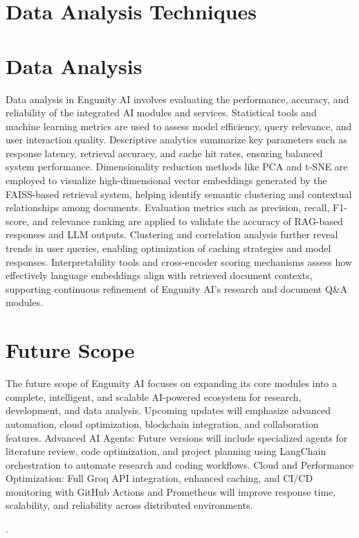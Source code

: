 \pagebreak

\section{Data Analysis Techniques}

\section{Data Analysis}

Data analysis in Engunity AI involves evaluating the performance, accuracy, and reliability of the integrated AI modules and services. Statistical tools and machine learning metrics are used to assess model efficiency, query relevance, and user interaction quality. Descriptive analytics summarize key parameters such as response latency, retrieval accuracy, and cache hit rates, ensuring balanced system performance.  
Dimensionality reduction methods like PCA and t-SNE are employed to visualize high-dimensional vector embeddings generated by the FAISS-based retrieval system, helping identify semantic clustering and contextual relationships among documents. Evaluation metrics such as precision, recall, F1-score, and relevance ranking are applied to validate the accuracy of RAG-based responses and LLM outputs.  
Clustering and correlation analysis further reveal trends in user queries, enabling optimization of caching strategies and model responses. Interpretability tools and cross-encoder scoring mechanisms assess how effectively language embeddings align with retrieved document contexts, supporting continuous refinement of Engunity AI’s research and document Q\&A modules.











 
\section{Future Scope}

The future scope of Engunity AI focuses on expanding its core modules into a complete, intelligent, and scalable AI-powered ecosystem for research, development, and data analysis. Upcoming updates will emphasize advanced automation, cloud optimization, blockchain integration, and collaboration features.
Advanced AI Agents: Future versions will include specialized agents for literature review, code optimization, and project planning using LangChain orchestration to automate research and coding workflows.
Cloud and Performance Optimization: Full Groq API integration, enhanced caching, and CI/CD monitoring with GitHub Actions and Prometheus will improve response time, scalability, and reliability across distributed environments.


.
 
 
